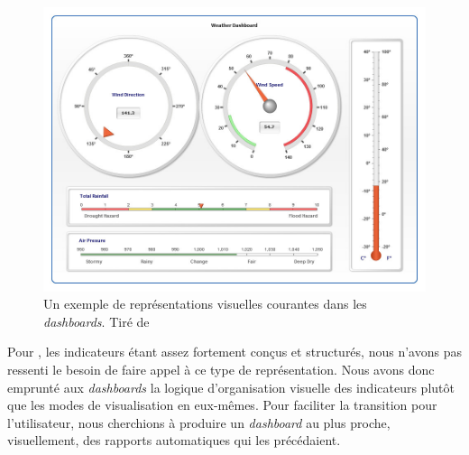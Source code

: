 \begin{figure}[H]
	\centering
	\includegraphics[width=.8\linewidth]{img/skeuomorphism.jpg}
	\caption[Un exemple de représentations visuelles courantes dans les \textit{dashboards}.]{Un exemple de représentations visuelles courantes dans les \textit{dashboards}. Tiré de \textcite{pandre_charts_2011}}
	\label{fig:skeuomorphism}
\end{figure}


Pour \simfeodal{}, les indicateurs étant assez fortement conçus et structurés, nous n'avons pas ressenti le besoin de faire appel à ce type de représentation.
Nous avons donc emprunté aux \textit{dashboards} la logique d'organisation visuelle des indicateurs plutôt que les modes de visualisation en eux-mêmes.
Pour faciliter la transition pour l'utilisateur, nous cherchions à produire un \textit{dashboard} au plus proche, visuellement, des rapports automatiques qui les précédaient.

